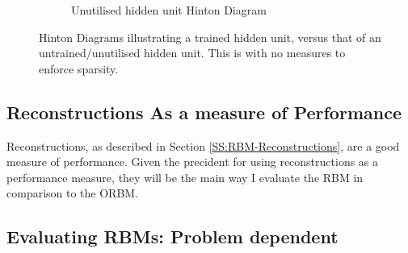 \begin{figure}[htb]
\begin{subfigure}[t]{0.3\textwidth}
      \caption{Unutilised hidden unit Hinton Diagram}
      \label{F:Hinton-Bad}
  \end{subfigure}
  \caption{Hinton Diagrams illustrating a trained hidden unit, versus that of an untrained/unutilised hidden unit. This is with no measures to enforce sparsity.}\label{fig:mnist-worse-best-results}
\end{figure}

\subsection{Reconstructions As a measure of Performance}

Reconstructions, as described in Section \ref{SS:RBM-Reconstructions}, are a good measure of performance.  Given the precident for using reconstructions as a performance measure, they will be the main way I evaluate the RBM in comparison to the ORBM.


\subsection{Evaluating RBMs: Problem dependent}


